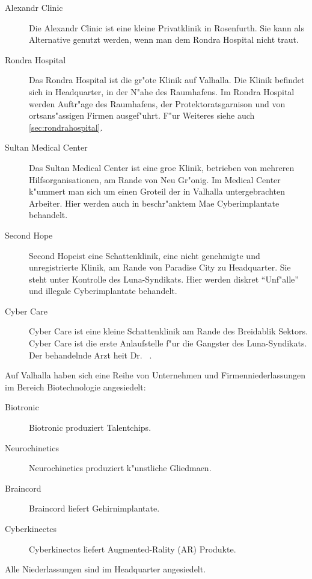 \begin{description}
    \item [Alexandr Clinic] Die Alexandr Clinic ist eine kleine Privatklinik in Rosenfurth. Sie kann als Alternative genutzt werden, wenn 
        man dem Rondra Hospital nicht traut.
    \item [Rondra Hospital] Das Rondra Hospital ist die gr"o\3te Klinik auf Valhalla. Die Klinik befindet sich in Headquarter, in der N"ahe 
        des Raumhafens. Im Rondra Hospital werden Auftr"age des Raumhafens, der Protektoratsgarnison und von ortsans"assigen Firmen ausgef"uhrt. F"ur Weiteres siehe auch \cref{sec:rondrahospital}. 
    \item [Sultan Medical Center] Das Sultan Medical Center ist eine gro\3e Klinik, betrieben von mehreren Hilfsorganisationen, am Rande von 
        Neu Gr"onig. Im Medical Center k"ummert man sich um einen Gro\3teil der in Valhalla untergebrachten Arbeiter. Hier werden auch in beschr"anktem Ma\3e Cyberimplantate behandelt.
    \item [Second Hope] Second Hopeist eine Schattenklinik, eine nicht genehmigte und unregistrierte Klinik, am Rande von Paradise City zu 
        Headquarter. Sie steht unter Kontrolle des Luna-Syndikats. Hier werden diskret ``Unf"alle'' und illegale Cyberimplantate behandelt.
    \item [ Cyber Care] Cyber Care ist eine kleine Schattenklinik am Rande des Breidablik Sektors. Cyber Care ist die erste 
        Anlaufstelle f"ur die Gangster des Luna-Syndikats. Der behandelnde Arzt hei\3t Dr.~ .
\end{description}


Auf Valhalla haben sich eine Reihe von Unternehmen und Firmenniederlassungen im Bereich Biotechnologie angesiedelt:

\begin{description}
    \item [Biotronic] Biotronic produziert Talentchips.
    \item [Neurochinetics] Neurochinetics produziert k"unstliche Gliedma\3en.
    \item [Braincord]  Braincord liefert Gehirnimplantate.
    \item [Cyberkinectcs] Cyberkinectcs liefert Augmented-Rality (AR) Produkte.
\end{description}

Alle Niederlassungen sind im Headquarter angesiedelt.

